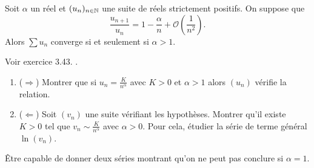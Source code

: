 \begin{tcolorbox}
    Soit $\alpha$ un réel et $(u_n)_{n \in \mathbb{N}}$ une suite de réels strictement positifs. On suppose que
    $$\displaystyle \frac{u_{n+1}}{u_n} = 1 - \frac{\alpha}{n} + \mathcal{O} \left( \frac{1}{n^2} \right).$$ Alors $\sum u_n$ converge si et seulement si $\alpha > 1$. 
\end{tcolorbox}

Voir exercice 3.43. \cite{oraux_x_ens_3}.
\begin{enumerate}
    \item ($\Rightarrow$) Montrer que si $u_n=\frac{K}{n^{\alpha}}$ avec $K>0$ et $\alpha > 1$ alors $(u_n)$ vérifie la relation.
    \item ($\Leftarrow$) Soit $(v_n)$ une suite vérifiant les hypothèses. Montrer qu'il existe $K>0$ tel que $v_n \sim \frac{K}{n^{\alpha}}$ avec $\alpha > 0$. Pour cela, étudier la série de terme général $\ln (v_n)$.
\end{enumerate}

Être capable de donner deux séries montrant qu'on ne peut pas conclure si $\alpha=1$.